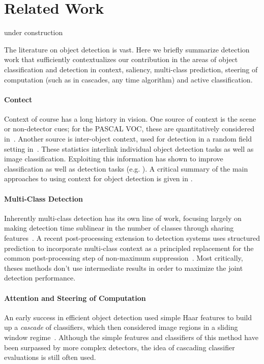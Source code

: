 \section{Related Work}

under construction

The literature on object detection is vast.
Here we briefly summarize detection work that sufficiently contextualizes our contribution in the areas of object classification and detection in context, saliency, multi-class prediction, steering of computation (such as in cascades, any time algorithm) and active classification.

\paragraph{Contect}
Context of course has a long history in vision.
One source of context is the scene or non-detector cues; for the PASCAL VOC, these are quantitatively considered in~\cite{Divvala2009}. 
Another source is inter-object context, used for detection in a random field setting in~\cite{Torralba2004}. These  statistics interlink individual object detection tasks as well as image classification. Exploiting this information has shown to improve classification as well as detection tasks (e.g. \cite{Torralba, visual phrases}).
A critical summary of the main approaches to using context for object detection is given in \cite{Galleguillos2010}.

\paragraph{Multi-Class Detection}
Inherently multi-class detection has its own line of work, focusing largely on making detection time sublinear in the number of classes through sharing features~\cite{Torralba2007,Fan2005,Razavi2011}.
A recent post-processing extension to detection systems uses structured prediction to incorporate multi-class context as a principled replacement for the common post-processing step of non-maximum suppression~\cite{Desai2009}. Most critically, theses methods don't use intermediate results in order to maximize the joint detection performance.

\paragraph{Attention and Steering of Computation}
An early success in efficient object detection used simple Haar features to build up a \emph{cascade} of classifiers, which then considered image regions in a sliding window regime~\cite{Viola2001}.
Although the simple features and classifiers of this method have been surpassed by more complex detectors, the idea of cascading classifier evaluations is still often used.

